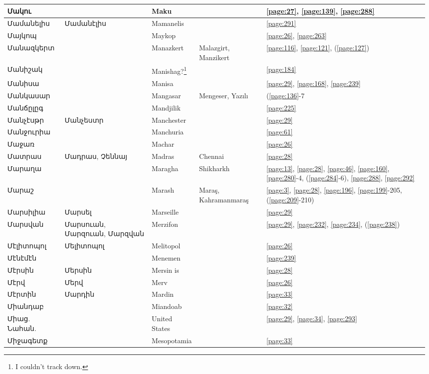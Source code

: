 \begin{center}
\begin{longtable}{|p{}|p{3cm}|p{3cm}|p{2cm}|p{3cm}|}
Մակու& & Maku& &\ref{page:27}, \ref{page:139}, \ref{page:288}\\ \hline
Մամանելիս& Մամանէլիս& Mamanelis& &\ref{page:291}\\ \hline
Մայկոպ& & Maykop& &\ref{page:26}, \ref{page:263}\\ \hline
Մանազկերտ& &Manazkert  & Malazgirt,  Manzikert &\ref{page:116}, \ref{page:121}, (\ref{page:127})\\ \hline
Մանիշակ& & Manishag?\footnote{I couldn't track down.}& &\ref{page:184}\\ \hline
Մանիսա& &Manisa & &\ref{page:29}, \ref{page:168}, \ref{page:239}\\ \hline
Մանկասար& & Mangasar  &Mengeser, Yazılı &(\ref{page:136}-7\\ \hline
Մանճըլըգ& &Mandjilik & &\ref{page:225}\\ \hline
Մանչէսթր&   Մանչեստր & Manchester& &\ref{page:29}\\ \hline
Մանջուրիա& &Manchuria & &\ref{page:61}\\ \hline
Մաջառ& & Machar&  &\ref{page:26}\\ \hline
Մատրաս& Մադրաս, Չեննայ& Madras& Chennai&\ref{page:28}\\ \hline
Մարաղա& & Maragha& Shikharkh&\ref{page:13}, \ref{page:28}, \ref{page:46}, \ref{page:160}, \ref{page:280}-4, (\ref{page:284}-6), \ref{page:288}, \ref{page:292}\\ \hline
Մարաշ& & Marash & Maraş, Kahramanmaraş  &\ref{page:3}, \ref{page:28}, \ref{page:196}, \ref{page:199}-205, (\ref{page:209}-210)\\ \hline
Մարսիլիա&Մարսել &Marseille & &\ref{page:29}\\ \hline
Մարսվան&Մարսուան, Մարզուան, Մարզվան &Merzifon & &\ref{page:29}, \ref{page:232}, \ref{page:234}, (\ref{page:238})\\ \hline
Մէլիտոպոլ&Մելիտոպոլ &Melitopol & &\ref{page:26}\\ \hline
Մէնէմէն& &Menemen & &\ref{page:239}\\ \hline
Մէրսին&Մերսին & Mersin is& &\ref{page:28}\\ \hline
Մէրվ& Մերվ&Merv & &\ref{page:26}\\ \hline
Մէրտին& Մարդին&Mardin & &\ref{page:33}\\ \hline
Միանդաբ& &Miandoab & &\ref{page:32}\\ \hline
Միաց. Նահան.& & United States& &\ref{page:29}, \ref{page:34}, \ref{page:293}\\ \hline
Միջագետք& &
Mesopotamia& &\ref{page:33}\\ \hline

\end{longtable}
\end{center}
